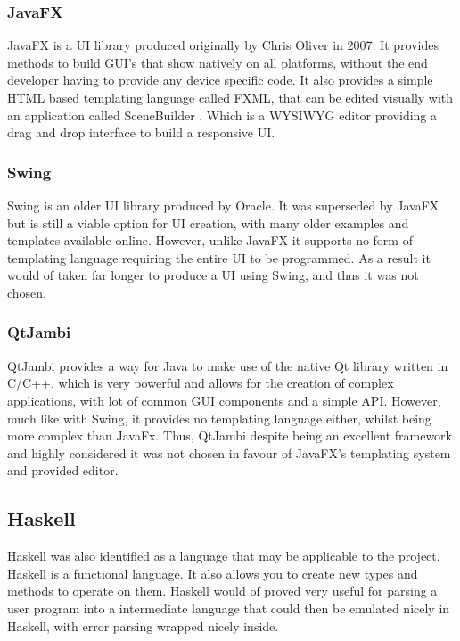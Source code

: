 \subsubsection{JavaFX}
JavaFX \cite{sunmicrosystems_2022_javafx} is a \ac{UI} library produced originally by Chris Oliver in 2007. It provides methods to build GUI's that show natively on all platforms, without the end developer having to provide any device specific code. It also provides a simple HTML based templating language called FXML, that can be edited visually with an application called SceneBuilder \cite{gluon_2022_scene}. Which is a \ac{WYSIWYG} editor providing a drag and drop interface to build a responsive \ac{UI}.

\subsubsection{Swing}
Swing \cite{oconner_2007_using} is an older \ac{UI} library produced by Oracle. It was superseded by JavaFX but is still a viable option for \ac{UI} creation, with many older examples and templates available online. However, unlike JavaFX it supports no form of templating language requiring the entire \ac{UI} to be programmed. As a result it would of taken far longer to produce a \ac{UI} using Swing, and thus it was not chosen.

\subsubsection{QtJambi}
QtJambi \cite{omixvisualization_2023_omixvisualizationqtjambi} provides a way for Java to make use of the native Qt library written in C/C++, which is very powerful and allows for the creation of complex applications, with lot of common GUI components and a simple API. However, much like with Swing, it provides no templating language either, whilst being more complex than JavaFx. Thus, QtJambi despite being an excellent framework and highly considered it was not chosen in favour of JavaFX's templating system and provided editor.

\subsection{Haskell}
Haskell \cite{marlow_2010_haskell} was also identified as a language that may be applicable to the project. Haskell is a functional language. It also allows you to create new types and methods to operate on them. Haskell would of proved very useful for parsing a user program into a intermediate language that could then be emulated nicely in Haskell, with error parsing wrapped nicely inside.

